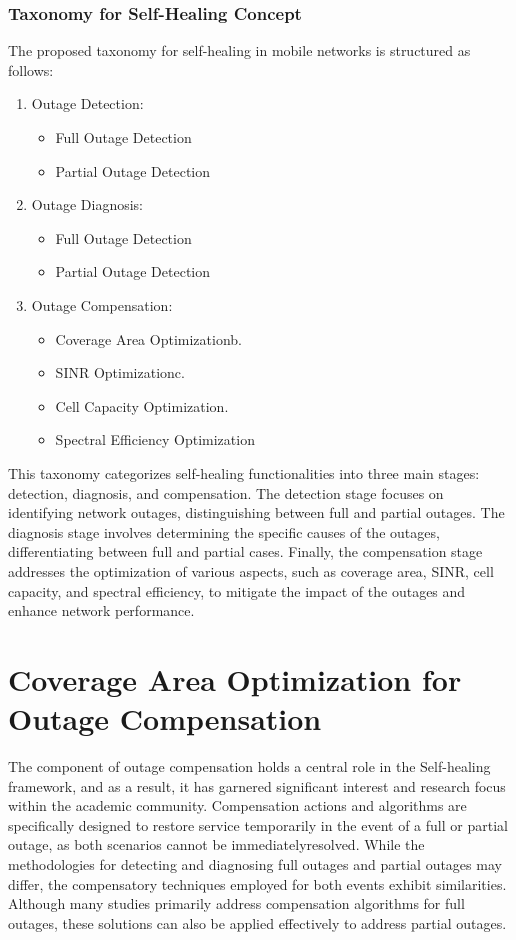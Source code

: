 \subsubsection{Taxonomy for Self-Healing Concept}

The proposed taxonomy for self-healing in mobile networks is structured as follows:
\begin{enumerate}
	\item  Outage Detection:
	\begin{itemize}
		\item Full Outage Detection
		\item Partial Outage Detection
	\end{itemize}

\item Outage Diagnosis:
	\begin{itemize}
	\item Full Outage Detection
	\item Partial Outage Detection
    \end{itemize}

\item Outage Compensation:
     \begin{itemize}
      \item Coverage Area Optimizationb.
      \item SINR Optimizationc.
       \item Cell Capacity Optimization.
       \item Spectral Efficiency Optimization
      \end{itemize}
\end{enumerate} 


This taxonomy categorizes self-healing functionalities into three main stages: detection, diagnosis, and compensation. The detection stage focuses on identifying network outages, distinguishing between full and partial outages. The diagnosis stage involves determining the specific causes of the outages, differentiating between full and partial cases. Finally, the compensation stage addresses the optimization of various aspects, such as coverage area, SINR, cell capacity, and spectral efficiency, to mitigate the impact of the outages and enhance network performance.


\section{Coverage Area Optimization for Outage Compensation}

The component of outage compensation holds a central role in the Self-healing framework, and as a result, it has garnered significant interest and research focus within the academic community. Compensation actions and algorithms are specifically designed to restore service temporarily in the event of a full or partial outage, as both scenarios cannot be immediatelyresolved. While the methodologies for detecting and diagnosing full outages and partial outages may differ, the compensatory techniques employed for both events exhibit similarities. Although many studies primarily address compensation algorithms for full outages, these solutions can also be applied effectively to address partial outages.

